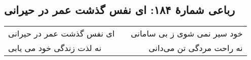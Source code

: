 \begin{center}
\section*{رباعی شمارهٔ ۱۸۴: ای نفس گذشت عمر در حیرانی}
\label{sec:184}
\begin{longtable}{l p{0.5cm} r}
ای نفس گذشت عمر در حیرانی
&&
خود سیر نمی شوی ز بی سامانی
\\
نه لذت زندگی خود می یابی
&&
نه راحت مردگی تن می‌دانی
\\
\end{longtable}
\end{center}
